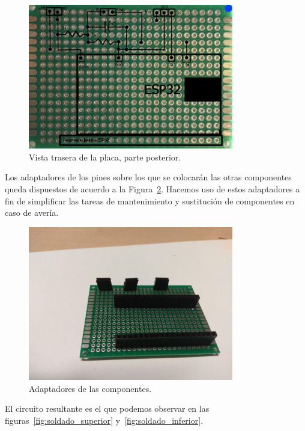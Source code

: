 \documentclass[a4paper,10pt]{article}
\begin{document}
\begin{figure}
  \centering
  \includegraphics[width=0.8\textwidth]{img/dibujo_placa_vista_superior_parte_trasera.png}
  \caption{Vista trasera de la placa, parte posterior.}\label{fig:placa-sup-inf}
\end{figure}

Los adaptadores de los pines sobre los que se colocarán las otras
componentes queda dispuestos de acuerdo a la
Figura~\ref{fig:visual-adaptadores}. Hacemos uso de estos adaptadores
a fin de simplificar las tareas de mantenimiento y sustitución de
componentes en caso de avería.

\begin{figure}
  \centering
  \includegraphics[width=0.8\textwidth]{img/placa_con_adaptadores_pines.jpg}
  \caption{Adaptadores de las componentes.}\label{fig:visual-adaptadores}
\end{figure}

El circuito resultante es el que podemos observar en las
figuras~\ref{fig:soldado_superior} y~\ref{fig:soldado_inferior}.
\end{document}
